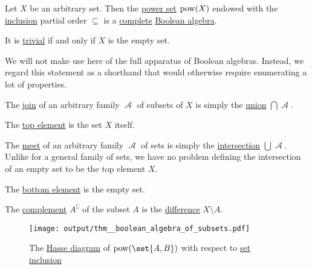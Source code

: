 \begin{proposition}\label{thm:boolean_algebra_of_subsets}
  Let \( X \) be an arbitrary set. Then the \hyperref[def:basic_set_operations/power_set]{power set} \( \operatorname{pow}(X) \) endowed with the \hyperref[def:subset]{inclusion} partial order \( \subseteq \) is a \hyperref[def:semilattice/complete]{complete} \hyperref[def:boolean_algebra]{Boolean algebra}.

  It is \hyperref[def:boolean_algebra/trivial]{trivial} if and only if \( X \) is the empty set.

  We will not make use here of the full apparatus of Boolean algebras. Instead, we regard this statement as a shorthand that would otherwise require enumerating a lot of properties.

  \begin{thmenum}
     The \hyperref[def:semilattice/join]{join} of an arbitrary family \( \mscrA \) of subsets of \( X \) is simply the \hyperref[def:basic_set_operations/union]{union} \( \bigcap \mscrA \).

     The \hyperref[def:partially_ordered_set_extremal_points/top_and_bottom]{top element} is the set \( X \) itself.

     The \hyperref[def:semilattice/meet]{meet} of an arbitrary family \( \mscrA \) of sets is simply the \hyperref[def:basic_set_operations/intersection]{intersection} \( \bigcup \mscrA \). Unlike for a general family of sets, we have no problem defining the intersection of an empty set to be the top element \( X \).

     The \hyperref[def:partially_ordered_set_extremal_points/top_and_bottom]{bottom element} is the empty set.

     The \hyperref[def:boolean_algebra]{complement} \( A^\complement \) of the subset \( A \) is the \hyperref[def:basic_set_operations/difference]{difference} \( X \setminus A \).
  \end{thmenum}

  \begin{figure}[!ht]
    \hfill
    \texttt{[image: output/thm\_\_boolean\_algebra\_of\_subsets.pdf]}
    \hfill\hfill
    \caption{The \hyperref[def:hasse_diagram]{Hasse diagram} of \( \pow(\set{ A, B }) \) with respect to \hyperref[def:subset]{set inclusion}}
    \label{fig:thm:boolean_algebra_of_subsets}
  \end{figure}
\end{proposition}
